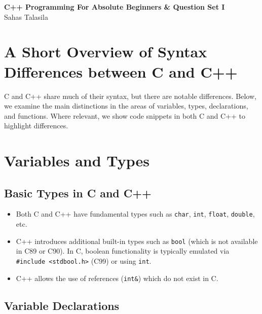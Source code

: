 \documentclass[a4paper,12pt]{article}
\begin{document}
\pagestyle{empty} 

\begin{titlepage}
    \centering
    \vspace*{2cm}
    \Huge{\textbf{C++ Programming For Absolute Beginners \& Question Set I}} \\[1.5cm]
    \Large{Sahas Talasila} \\[1cm]
    \vfill
    \vfill
\end{titlepage}

\tableofcontents
\newpage


\section*{A Short Overview of Syntax Differences between C and C++}

C and C++ share much of their syntax, but there are notable differences. Below, we examine the main distinctions in the areas of variables, types, declarations, and functions. Where relevant, we show code snippets in both C and C++ to highlight differences.

\section{Variables and Types}

\subsection{Basic Types in C and C++}
\begin{itemize}
    \item Both C and C++ have fundamental types such as \texttt{char}, \texttt{int}, \texttt{float}, \texttt{double}, etc.
    \item C++ introduces additional built-in types such as \texttt{bool} (which is not available in C89 or C90). In C, boolean functionality is typically emulated via \texttt{\#include <stdbool.h>} (C99) or using \texttt{int}.
    \item C++ allows the use of references (\texttt{int\&}) which do not exist in C.
\end{itemize}

\subsection{Variable Declarations}
\end{document}

